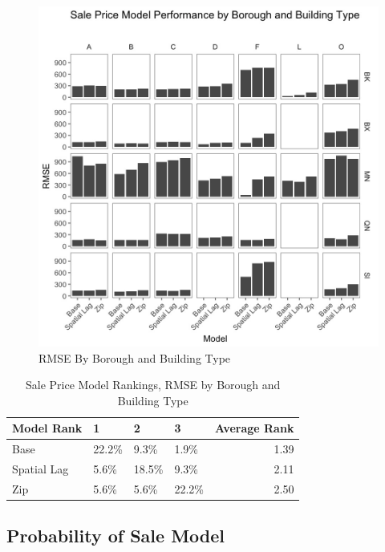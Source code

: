 \documentclass[12pt,]{article}
\begin{document}
\begin{figure}[h]
\includegraphics[width=1\linewidth]{Sections/tables and figures/RMSE by boro and build type} \caption{RMSE By Borough and Building Type}\label{fig:RMSE by boro and build type}
\end{figure}

\begin{table}

\caption{\label{tab:Sale Price Model Rank Distributions}\label{tab:SalePriceModelRank} Sale Price Model Rankings, RMSE by Borough and Building Type}
\centering
\begin{tabular}[t]{llllr}
\toprule
Model Rank & 1 & 2 & 3 & Average Rank\\
\midrule
Base & 22.2\% & 9.3\% & 1.9\% & 1.39\\
Spatial Lag & 5.6\% & 18.5\% & 9.3\% & 2.11\\
Zip & 5.6\% & 5.6\% & 22.2\% & 2.50\\
\bottomrule
\end{tabular}
\end{table}

\hypertarget{probability-of-sale-model}{%
\subsection{Probability of Sale Model}\label{probability-of-sale-model}}
\end{document}
